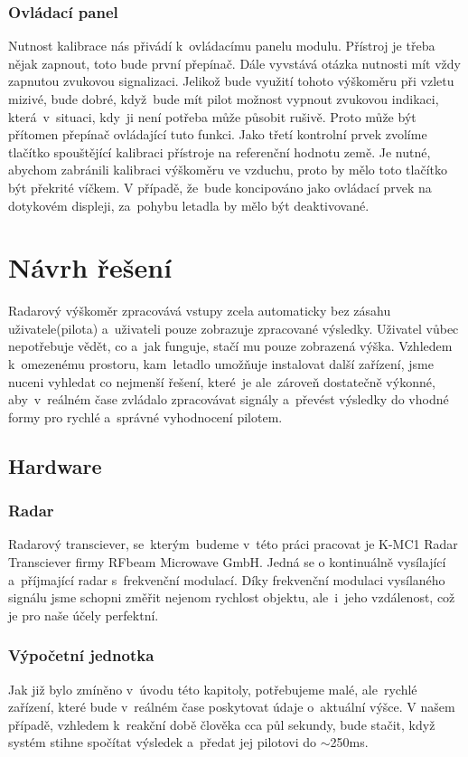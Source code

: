 			\subsection{Ovládací panel}
				Nutnost kalibrace nás přivádí k~ovládacímu panelu modulu. Přístroj je třeba nějak zapnout, toto bude první přepínač. Dále vyvstává otázka nutnosti mít vždy zapnutou zvukovou signalizaci. Jelikož bude využití tohoto výškoměru při vzletu mizivé, bude dobré, když~bude mít pilot možnost vypnout zvukovou indikaci, která~v~situaci, kdy~ji není potřeba může působit rušivě. Proto může být přítomen přepínač ovládající tuto funkci. Jako třetí kontrolní prvek zvolíme tlačítko spouštějící kalibraci přístroje na referenční hodnotu země. Je nutné, abychom zabránili kalibraci výškoměru ve vzduchu, proto by mělo toto tlačítko být překrité víčkem. V případě, že~bude koncipováno jako ovládací prvek na dotykovém displeji, za~pohybu letadla by mělo být deaktivované.
				
			
\chapter{Návrh řešení}\label{navrhReseni}
	Radarový výškoměr zpracovává vstupy zcela automaticky bez zásahu uživatele(pilota) a~uživateli pouze zobrazuje zpracované výsledky. Uživatel vůbec nepotřebuje vědět, co a~jak funguje, stačí mu pouze zobrazená výška. Vzhledem k~omezenému prostoru, kam~letadlo umožňuje instalovat další zařízení, jsme nuceni vyhledat co nejmenší řešení, které~je ale~zároveň dostatečně výkonné, aby~v~reálném čase zvládalo zpracovávat signály a~převést výsledky do vhodné formy pro rychlé a~správné vyhodnocení pilotem.
	
	\section{Hardware}\label{navrhReseni::hardware}
		\subsection{Radar}
			Radarový transciever, se~kterým~budeme v~této práci pracovat je K-MC1 Radar Transciever firmy RFbeam Microwave GmbH. Jedná se o kontinuálně vysílající a~příjmající radar s~frekvenční modulací. Díky frekvenční modulaci vysílaného signálu jsme schopni změřit nejenom rychlost objektu, ale~i~jeho vzdálenost, což je pro naše účely perfektní.
		
		\subsection{Výpočetní jednotka}\label{navrhReseni::hardware::vypocetniJednotka}
			Jak již bylo zmíněno v~úvodu této kapitoly, potřebujeme malé, ale~rychlé zařízení, které bude v~reálném čase poskytovat údaje o~aktuální výšce. V našem případě, vzhledem k~reakční době člověka cca půl sekundy, bude stačit, když systém stihne spočítat výsledek a~předat jej pilotovi do $\sim$250ms.\par
		
